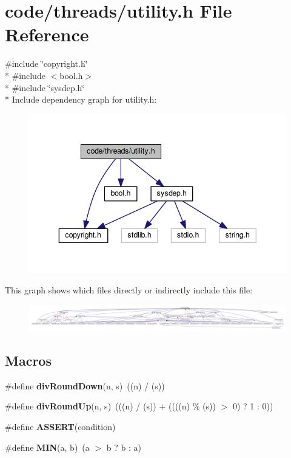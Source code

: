 \section{code/threads/utility.h File Reference}
\label{utility_8h}
{\ttfamily \#include \char`\"{}copyright.\+h\char`\"{}}\\*
{\ttfamily \#include $<$bool.\+h$>$}\\*
{\ttfamily \#include \char`\"{}sysdep.\+h\char`\"{}}\\*
Include dependency graph for utility.\+h\+:
\nopagebreak
\begin{figure}[H]
\begin{center}
\leavevmode
\includegraphics[width=343pt]{utility_8h__incl}
\end{center}
\end{figure}
This graph shows which files directly or indirectly include this file\+:
\nopagebreak
\begin{figure}[H]
\begin{center}
\leavevmode
\includegraphics[width=350pt]{utility_8h__dep__incl}
\end{center}
\end{figure}
\subsection*{Macros}
\begin{DoxyCompactItemize}
\item 
\#define {\bf div\+Round\+Down}(n,  s)~((n) / (s))
\item 
\#define {\bf div\+Round\+Up}(n,  s)~(((n) / (s)) + ((((n) \% (s)) $>$ 0) ? 1 \+: 0))
\item 
\#define {\bf A\+S\+S\+E\+RT}(condition)
\item 
\#define {\bf M\+IN}(a,  b)~(a $>$ b ? b \+: a)
\end{DoxyCompactItemize}
